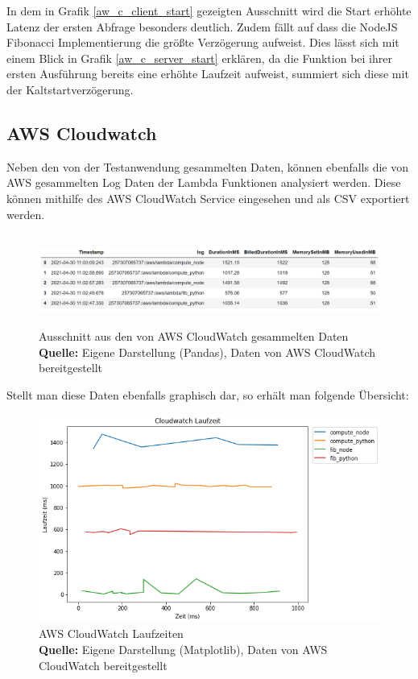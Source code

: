 \documentclass[12pt,a4paper,parskip=half]{scrreprt}
\newcommand*{\captionsource}[2]{%
	\caption[{#1}]{%
		#1%
		\\\hspace{\linewidth}%
		\textbf{Quelle:} #2%
	}%
}
\begin{document}
In dem in Grafik \ref{aw_c_client_start} gezeigten Ausschnitt wird die Start erhöhte Latenz der ersten Abfrage besonders deutlich. Zudem fällt auf dass die NodeJS Fibonacci Implementierung die größte Verzögerung aufweist. Dies lässt sich mit einem Blick in Grafik \ref{aw_c_server_start} erklären, da die Funktion bei ihrer ersten Ausführung bereits eine erhöhte Laufzeit aufweist, summiert sich diese mit der Kaltstartverzögerung.

\subsection{AWS Cloudwatch}

Neben den von der Testanwendung gesammelten Daten, können ebenfalls die von AWS gesammelten Log Daten der Lambda Funktionen analysiert werden. Diese können mithilfe des AWS CloudWatch Service eingesehen und als CSV exportiert werden. 

\FloatBarrier
\begin{figure}[h!]
	\centering
	\includegraphics[width=15cm, height=3cm]{CloudWatchDataExample}
	\captionsource{Ausschnitt aus den von AWS CloudWatch gesammelten Daten}
	{Eigene Darstellung (Pandas), Daten von AWS CloudWatch bereitgestellt}
	\label{CloudWatchDFHead}
\end{figure}
\FloatBarrier

Stellt man diese Daten ebenfalls graphisch dar, so erhält man folgende Übersicht:

\FloatBarrier
\begin{figure}[h!]
	\centering
	\includegraphics[scale=0.7]{aw_c_cloudwatch}
	\captionsource{AWS CloudWatch Laufzeiten}
	{Eigene Darstellung (Matplotlib), Daten von AWS CloudWatch bereitgestellt}
	\label{aw_c_cloudwatch}
\end{figure}
\FloatBarrier
\end{document}
